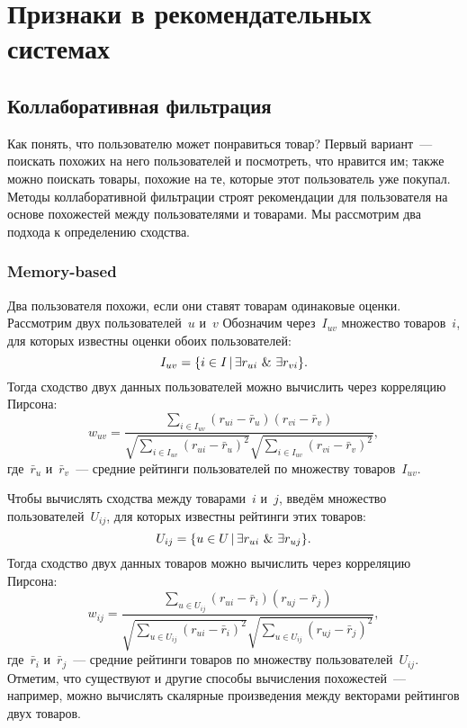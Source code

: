 \documentclass[12pt,fleqn]{article}
\begin{document}
\section{Признаки в рекомендательных системах}

\subsection{Коллаборативная фильтрация}
Как понять, что пользователю может понравиться товар?
Первый вариант~--- поискать похожих на него пользователей и посмотреть, что нравится им;
также можно поискать товары, похожие на те, которые этот пользователь уже покупал.
Методы коллаборативной фильтрации строят рекомендации для пользователя на основе
похожестей между пользователями и товарами.
Мы рассмотрим два подхода к определению сходства.

\subsubsection{Memory-based}
Два пользователя похожи, если они ставят товарам одинаковые оценки.
Рассмотрим двух пользователей~$u$ и~$v$
Обозначим через~$I_{uv}$ множество товаров~$i$, для которых известны
оценки обоих пользователей:
\[
    I_{uv}
    =
    \{
        i \in I
        \cond
        \exists r_{ui}
        \ \&\ 
        \exists r_{vi}
    \}.
\]
Тогда сходство двух данных пользователей можно вычислить через корреляцию Пирсона:
\[
    w_{uv}
    =
    \frac{
        \sum_{i \in I_{uv}}
            (r_{ui} - \bar r_u)
            (r_{vi} - \bar r_v)
    }{
        \sqrt{
        \sum_{i \in I_{uv}}
            (r_{ui} - \bar r_u)^2
        }
        \sqrt{
        \sum_{i \in I_{uv}}
            (r_{vi} - \bar r_v)^2
        }
    },
\]
где~$\bar r_u$ и~$\bar r_v$~--- средние рейтинги пользователей по множеству товаров~$I_{uv}$.

Чтобы вычислять сходства между товарами~$i$ и~$j$, введём множество пользователей~$U_{ij}$,
для которых известны рейтинги этих товаров:
\[
    U_{ij}
    =
    \{
        u \in U
        \cond
        \exists r_{ui}
        \ \&\ 
        \exists r_{uj}
    \}.
\]
Тогда сходство двух данных товаров можно вычислить через корреляцию Пирсона:
\[
    w_{ij}
    =
    \frac{
        \sum_{u \in U_{ij}}
            (r_{ui} - \bar r_i)
            (r_{uj} - \bar r_j)
    }{
        \sqrt{
        \sum_{u \in U_{ij}}
            (r_{ui} - \bar r_i)^2
        }
        \sqrt{
        \sum_{u \in U_{ij}}
            (r_{uj} - \bar r_j)^2
        }
    },
\]
где~$\bar r_i$ и~$\bar r_j$~--- средние рейтинги товаров по множеству пользователей~$U_{ij}$.
Отметим, что существуют и другие способы вычисления похожестей~---
например, можно вычислять скалярные произведения между векторами рейтингов двух товаров.
\end{document}
